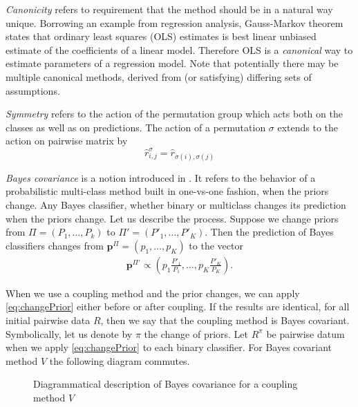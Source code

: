 \documentclass[twoside,11pt]{article}
\begin{document}
\emph{Canonicity} refers to requirement that the method should be in a natural way unique. Borrowing an example from regression analysis, Gauss-Markov theorem states that ordinary least squares (OLS) estimates is best linear unbiased estimate of the coefficients of a linear model. Therefore OLS  is a \emph{canonical} way to estimate parameters of a regression model. Note that potentially there may be multiple canonical methods, derived from (or satisfying) differing sets of assumptions. 

\emph{Symmetry} refers to the action of the permutation group which acts both on the classes as well as on predictions. The action of a permutation $\sigma$ extends to the action on pairwise matrix by 
\begin{equation}
	\hat r^\sigma_{i,j} = \hat r_{\sigma(i), \sigma(j)}
\end{equation}

\emph{Bayes covariance} is a notion introduced in  \cite{vsuch2016bayes}. It refers to the behavior of a probabilistic multi-class method built in one-vs-one fashion, when the priors change. Any Bayes classifier, whether binary or multiclass changes its prediction when the priors change. Let us describe the process. Suppose we change priors from $\Pi = (P_1, \ldots, P_k)$ to $\Pi'= (P'_1, \ldots, P'_K)$. Then the prediction of Bayes classifiers changes from $\boldsymbol{p}^\Pi= (p_1, \ldots, p_K)$ to the vector 
\begin{align}
\boldsymbol{p}^{\Pi'} \propto (p_1 \frac{P'_1}{P_1}, \ldots, p_K \frac{P'_K}{P_K}). \label{eq:changePrior}
\end{align}

When we use a coupling method and the prior changes, we  can apply \eqref{eq:changePrior} either before or after coupling. If the results are identical, for all initial pairwise data $R$, then we say that the coupling method is Bayes covariant. Symbolically, let us denote by  $\pi$ the change of priors. Let $R^\pi$ be pairwise datum when we apply \eqref{eq:changePrior} to each binary classifier.
For Bayes covariant method $V$ the following diagram commutes.

\begin{figure}[!h]
\centering
{}
\caption{Diagrammatical description of Bayes covariance for a coupling method $V$}
\label{fig:bc}
\end{figure}
\end{document}
